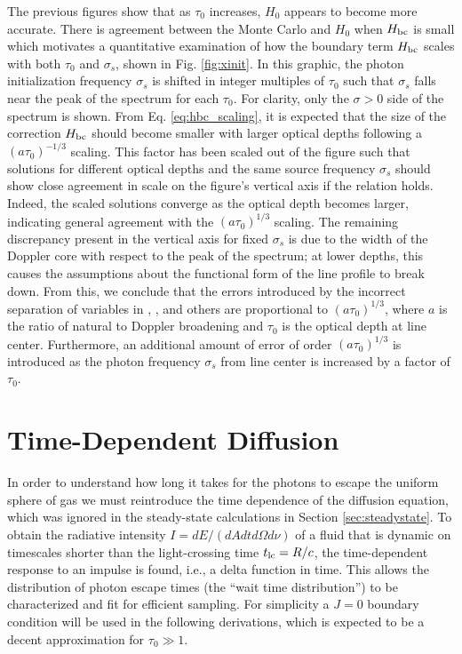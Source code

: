 \documentclass{aastex63}
\begin{document}
The previous figures show that as $\tau_0$ increases, $H_0$ appears to become more accurate. There is agreement between the Monte Carlo and $H_0$ when $H_{\rm bc}$ is small which motivates a quantitative examination of how the boundary term $H_{\rm bc}$ scales with both $\tau_0$ and $\sigma_s$, shown in Fig. \ref{fig:xinit}. In this graphic, the photon initialization frequency $\sigma_s$ is shifted in integer multiples of $\tau_0$ such that $\sigma_s$ falls near the peak of the spectrum for each $\tau_0$. For clarity, only the $\sigma > 0$ side of the spectrum is shown. From Eq. \ref{eq:hbc_scaling}, it is expected that the size of the correction $H_{\rm bc}$ should become smaller with larger optical depths following a $(a\tau_0)^{-1/3}$ scaling. This factor has been scaled out of the figure such that solutions for different optical depths and the same source frequency $\sigma_s$ should show close agreement in scale on the figure's vertical axis if the relation holds. Indeed, the scaled solutions converge as the optical depth becomes larger, indicating general agreement with the $(a\tau_0)^{1/3}$ scaling. The remaining discrepancy present in the vertical axis for fixed $\sigma_s$ is due to the width of the Doppler core with respect to the peak of the spectrum; at lower depths, this causes the assumptions about the functional form of the line profile to break down. From this, we conclude that the errors introduced by the incorrect separation of variables in \cite{1973MNRAS.162...43H}, \cite{1990ApJ...350..216N}, \cite{2006ApJ...649...14D} and others are proportional to $(a\tau_0)^{1/3}$, where $a$ is the ratio of natural to Doppler broadening and $\tau_0$ is the optical depth at line center. Furthermore, an additional amount of error of order $(a\tau_0)^{1/3}$ is introduced as the photon frequency $\sigma_s$ from line center is increased by a factor of $\tau_0$.

\section{Time-Dependent Diffusion}
\label{sec:time_dependent}

In order to understand how long it takes for the photons to escape the uniform sphere of gas we must reintroduce the time dependence of the diffusion equation, which was ignored in the steady-state calculations in Section \ref{sec:steadystate}. To obtain the radiative intensity $I=dE/(dAdtd\Omega d\nu)$ of a fluid that is dynamic on timescales shorter than the light-crossing time $t_{\rm lc} = R/c$, the time-dependent response to an impulse is found, i.e., a delta function in time. This allows the distribution of photon escape times (the ``wait time distribution'') to be characterized and fit for efficient sampling. For simplicity a $J=0$ boundary condition will be used in the following derivations, which is expected to be a decent approximation for $\tau_0 \gg 1$. 
\end{document}

